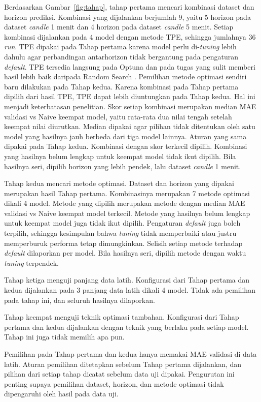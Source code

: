 Berdasarkan Gambar~\ref{fig:tahap}, tahap pertama mencari kombinasi dataset dan
horizon prediksi. Kombinasi yang dijalankan berjumlah 9, yaitu 5 horizon pada
dataset \textit{candle} 1 menit dan 4 horizon pada dataset \textit{candle}
5 menit. Setiap kombinasi
dijalankan pada 4 model dengan metode TPE, sehingga jumlahnya 36
\textit{run}.
TPE dipakai pada Tahap pertama karena model perlu di-\textit{tuning} lebih
dahulu agar perbandingan antarhorizon tidak bergantung pada pengaturan
\textit{default}. TPE tersedia langsung pada Optuna \cite{akiba2019} dan
pada tugas yang sulit memberi hasil lebih baik daripada Random Search
\cite{bergstra2011}. Pemilihan metode optimasi sendiri baru dilakukan pada Tahap kedua. Karena
kombinasi pada Tahap pertama dipilih dari
hasil TPE, TPE dapat lebih diuntungkan pada Tahap kedua. Hal ini menjadi keterbatasan penelitian.
Skor setiap kombinasi merupakan median MAE validasi vs Naive keempat model,
yaitu rata-rata dua nilai tengah setelah keempat nilai diurutkan. Median
dipakai agar pilihan tidak ditentukan oleh satu model yang hasilnya jauh
berbeda dari tiga model lainnya. Aturan yang sama dipakai pada Tahap kedua.
Kombinasi dengan skor terkecil dipilih. Kombinasi yang hasilnya belum lengkap
untuk keempat model tidak ikut dipilih.
Bila hasilnya seri, dipilih horizon yang lebih pendek, lalu dataset
\textit{candle} 1 menit.

Tahap kedua mencari metode optimasi. Dataset dan horizon yang dipakai merupakan
hasil Tahap pertama. Kombinasinya merupakan 7 metode optimasi dikali 4 model.
Metode yang dipilih merupakan metode dengan median MAE validasi vs Naive
keempat model terkecil. Metode yang hasilnya
belum lengkap untuk keempat model juga tidak ikut dipilih. Pengaturan
\textit{default} juga boleh terpilih, sehingga kesimpulan bahwa
\textit{tuning} tidak memperbaiki atau justru memperburuk performa tetap
dimungkinkan. Selisih setiap metode terhadap \textit{default} dilaporkan per
model. Bila hasilnya seri, dipilih metode dengan waktu \textit{tuning}
terpendek.

Tahap ketiga menguji panjang data latih. Konfigurasi dari Tahap pertama dan
kedua dijalankan pada 3 panjang data latih dikali 4 model. Tidak ada
pemilihan pada tahap ini, dan seluruh hasilnya dilaporkan.

Tahap keempat menguji teknik optimasi tambahan. Konfigurasi dari Tahap pertama
dan kedua dijalankan dengan teknik yang berlaku pada setiap model. Tahap ini
juga tidak memilih apa pun.

Pemilihan pada Tahap pertama dan kedua hanya memakai MAE validasi di data
latih. Aturan pemilihan ditetapkan sebelum Tahap pertama dijalankan, dan
pilihan dari setiap tahap dicatat sebelum data uji dipakai. Pengurutan ini
penting supaya pemilihan dataset, horizon, dan metode optimasi tidak
dipengaruhi oleh hasil pada data uji.

